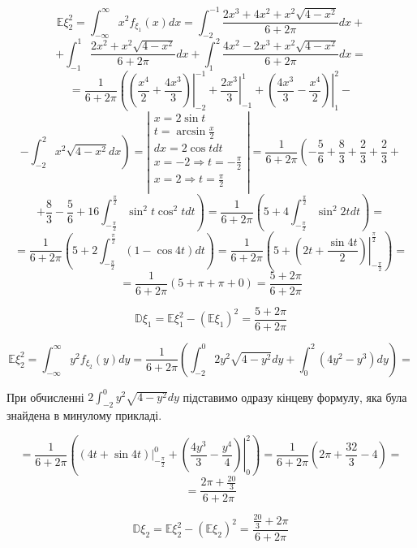 \documentclass[14pt, a4paper, ukrainian]{extreport}
\begin{document}
	$$ \mathbb{E}\xi_2^2 = \int_{-\infty}^{\infty}x^2f_{\xi_1}(x)dx = \int_{-2}^{-1}\frac{2x^3 + 4x^2 + x^2\sqrt{4-x^2}}{6+2\pi}dx +
	$$
	$$ + \int_{-1}^{1}\frac{2x^2 + x^2\sqrt{4-x^2}}{6+2\pi}dx + \int_{1}^{2}\frac{4x^2-2x^3 + x^2\sqrt{4-x^2}}{6+2\pi}dx =
	$$
	$$ = \frac{1}{6+2\pi}\left(\left.\left(\frac{x^4}{2} + \frac{4x^3}{3} \right)\right|_{-2}^{-1} + \left.{\frac{2x^3}{3}}\right|_{-1}^{1} + \left.\left(\frac{4x^3}{3} - \frac{x^4}{2}\right)\right|_{1}^{2} - \right.$$
	$$ - \left.\int_{-2}^{2}x^2\sqrt{4-x^2}dx\right) = \left|
	\begin{matrix}
		x = 2\sin{t}\\
		t = \arcsin{\frac{x}{2}}\\
		dx = 2\cos{t}dt\\
		x = -2 \Rightarrow t = -\frac{\pi}{2}\\
		x = 2 \Rightarrow t = \frac{\pi}{2}\\
	\end{matrix}
	\right| = 
	\frac{1}{6+2\pi} \left(-\frac{5}{6} + \frac{8}{3} + \frac{2}{3} + \frac{2}{3} + \right.
	$$ 
	$$ + \frac{8}{3} - \frac{5}{6} + \left.16\int_{-\frac{\pi}{2}}^{\frac{\pi}{2}}\sin^2{t}\cos^2{t}dt \right) = \frac{1}{6+2\pi}\left(5 + 4 \int_{-\frac{\pi}{2}}^{\frac{\pi}{2}}\sin^2{2t}dt\right) =
	$$
	$$ = \frac{1}{6+2\pi}\left(5 + 2\int_{-\frac{\pi}{2}}^{\frac{\pi}{2}}(1 - \cos{4t})dt\right)
	 = \frac{1}{6+2\pi}\left(5 + \left.\left(2t + \frac{\sin{4t}}{2}\right)\right|_{-\frac{\pi}{2}}^{\frac{\pi}{2}}\right) =
	$$
	$$ = \frac{1}{6+2\pi}\left(5 + \pi + \pi + 0 \right) =
	 \frac{5 + 2\pi}{6+2\pi}
	$$
	
	$$\mathbb{D}\xi_1 = \mathbb{E}\xi_1^2 - (\mathbb{E}\xi_1)^2 =\frac{5 + 2\pi}{6+2\pi} 
	$$	
	
	$$\mathbb{E}\xi_2^2 = \int_{-\infty}^{\infty}y^2f_{\xi_2}(y)dy = \frac{1}{6+2\pi}\left(\int_{-2}^{0}2y^2\sqrt{4-y^2}dy + \int_{0}^{2}(4y^2-y^3)dy\right) =$$
	
	При обчисленні $2\int_{-2}^{0}y^2\sqrt{4-y^2}dy$ підставимо одразу кінцеву формулу, яка була знайдена в минулому прикладі.
	
	$$ = \frac{1}{6 + 2\pi}\left(\left.\left(4t + \sin{4t}\right)\right|_{-\frac{\pi}{2}}^{0} + \left.\left(\frac{4y^3}{3} - \frac{y^4}{4}\right)\right|_0^2 \right) = 
	\frac{1}{6 + 2\pi}\left(2\pi + \frac{32}{3} - 4 \right) = 
	$$
	$$ = \frac{2\pi + \frac{20}{3} }{6 + 2\pi}$$
	
	$$\mathbb{D}\xi_2 = \mathbb{E}\xi_2^2 - (\mathbb{E}\xi_2)^2 = \frac{\frac{20}{3} + 2\pi}{6+2\pi}
	$$	
	
\end{document}

